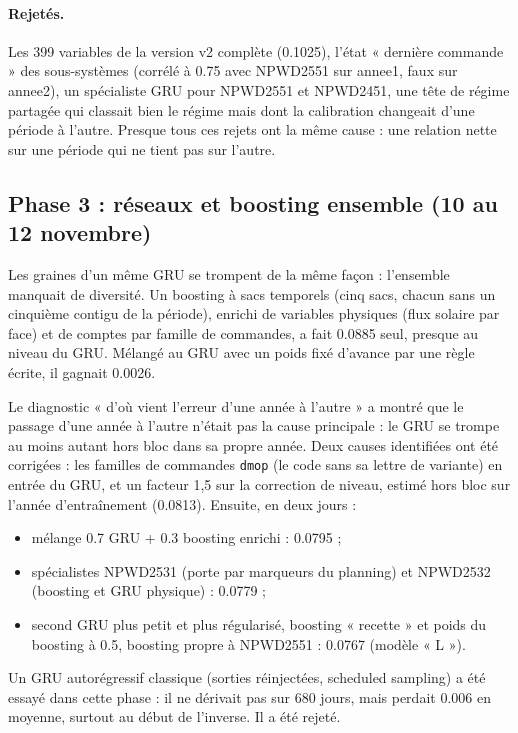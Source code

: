 \documentclass[11pt,a4paper]{article}
\newcommand{\code}[1]{\texttt{#1}}
\begin{document}
\paragraph{Rejetés.} Les 399 variables de la version v2 complète (0.1025), l'état « dernière commande » des sous-systèmes (corrélé à 0.75 avec NPWD2551 sur annee1, faux sur annee2), un spécialiste GRU pour NPWD2551 et NPWD2451, une tête de régime partagée qui classait bien le régime mais dont la calibration changeait d'une période à l'autre. Presque tous ces rejets ont la même cause : une relation nette sur une période qui ne tient pas sur l'autre.

\subsection{Phase 3 : réseaux et boosting ensemble (10 au 12 novembre)}

Les graines d'un même GRU se trompent de la même façon : l'ensemble manquait de diversité. Un boosting à sacs temporels (cinq sacs, chacun sans un cinquième contigu de la période), enrichi de variables physiques (flux solaire par face) et de comptes par famille de commandes, a fait 0.0885 seul, presque au niveau du GRU. Mélangé au GRU avec un poids fixé d'avance par une règle écrite, il gagnait 0.0026.

Le diagnostic « d'où vient l'erreur d'une année à l'autre » a montré que le passage d'une année à l'autre n'était pas la cause principale : le GRU se trompe au moins autant hors bloc dans sa propre année. Deux causes identifiées ont été corrigées : les familles de commandes \code{dmop} (le code sans sa lettre de variante) en entrée du GRU, et un facteur 1,5 sur la correction de niveau, estimé hors bloc sur l'année d'entraînement (0.0813). Ensuite, en deux jours :
\begin{itemize}
  \item mélange 0.7 GRU + 0.3 boosting enrichi : 0.0795 ;
  \item spécialistes NPWD2531 (porte par marqueurs du planning) et NPWD2532 (boosting et GRU physique) : 0.0779 ;
  \item second GRU plus petit et plus régularisé, boosting « recette » et poids du boosting à 0.5, boosting propre à NPWD2551 : 0.0767 (modèle « L »).
\end{itemize}
Un GRU autorégressif classique (sorties réinjectées, scheduled sampling) a été essayé dans cette phase : il ne dérivait pas sur 680 jours, mais perdait 0.006 en moyenne, surtout au début de l'inverse. Il a été rejeté.
\end{document}
